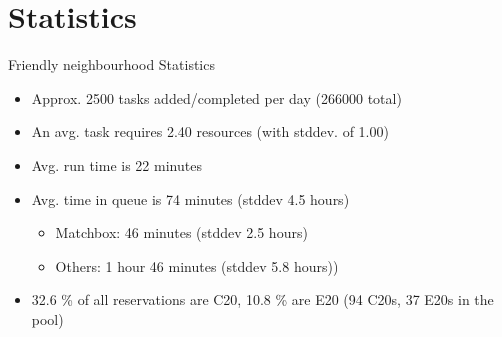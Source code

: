 \documentclass[xcolor=pdftex,dvipsnames,table]{beamer}
\begin{document}
\section{Statistics}
\begin{frame}
Friendly neighbourhood Statistics
\begin{itemize}
  \item Approx. 2500 tasks added/completed per day (266000 total)
  \item An avg. task requires 2.40 resources (with stddev. of 1.00)
  \item Avg. run time is 22 minutes
  \item Avg. time in queue is 74 minutes (stddev 4.5 hours)
    \begin{itemize}
      \item Matchbox: 46 minutes (stddev 2.5 hours)
      \item Others: 1 hour 46 minutes (stddev 5.8 hours))
    \end{itemize}
  \item 32.6 \% of all reservations are C20, 10.8 \% are E20 (94 C20s, 37 E20s in the pool)
\end{itemize}
\end{frame}
\end{document}
